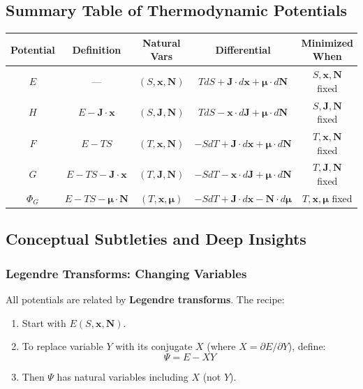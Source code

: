\documentclass[9pt,twocoloumn]{article}
\begin{document}
\subsection{Summary Table of Thermodynamic Potentials}

\begin{center}
\begin{tabular}{ccccc}
\hline
\textbf{Potential} & \textbf{Definition} & \textbf{Natural Vars} & \textbf{Differential} & \textbf{Minimized When} \\
\hline
$E$ & --- & $(S, \mathbf{x}, \mathbf{N})$ & $T dS + \mathbf{J} \cdot d\mathbf{x} + \boldsymbol{\mu} \cdot d\mathbf{N}$ & $S, \mathbf{x}, \mathbf{N}$ fixed \\
$H$ & $E - \mathbf{J} \cdot \mathbf{x}$ & $(S, \mathbf{J}, \mathbf{N})$ & $T dS - \mathbf{x} \cdot d\mathbf{J} + \boldsymbol{\mu} \cdot d\mathbf{N}$ & $S, \mathbf{J}, \mathbf{N}$ fixed \\
$F$ & $E - TS$ & $(T, \mathbf{x}, \mathbf{N})$ & $-S dT + \mathbf{J} \cdot d\mathbf{x} + \boldsymbol{\mu} \cdot d\mathbf{N}$ & $T, \mathbf{x}, \mathbf{N}$ fixed \\
$G$ & $E - TS - \mathbf{J} \cdot \mathbf{x}$ & $(T, \mathbf{J}, \mathbf{N})$ & $-S dT - \mathbf{x} \cdot d\mathbf{J} + \boldsymbol{\mu} \cdot d\mathbf{N}$ & $T, \mathbf{J}, \mathbf{N}$ fixed \\
$\Phi_G$ & $E - TS - \boldsymbol{\mu} \cdot \mathbf{N}$ & $(T, \mathbf{x}, \boldsymbol{\mu})$ & $-S dT + \mathbf{J} \cdot d\mathbf{x} - \mathbf{N} \cdot d\boldsymbol{\mu}$ & $T, \mathbf{x}, \boldsymbol{\mu}$ fixed \\
\hline
\end{tabular}
\end{center}

\subsection{Conceptual Subtleties and Deep Insights}

\subsubsection{Legendre Transforms: Changing Variables}

All potentials are related by \textbf{Legendre transforms}. The recipe:
\begin{enumerate}
    \item Start with $E(S, \mathbf{x}, \mathbf{N})$.
    \item To replace variable $Y$ with its conjugate $X$ (where $X = \partial E/\partial Y$), define:
    \begin{equation}
    \Psi = E - XY
    \end{equation}
    \item Then $\Psi$ has natural variables including $X$ (not $Y$).
\end{enumerate}
\end{document}
